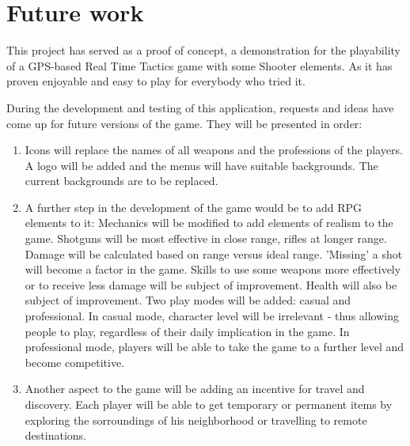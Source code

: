 
\section{Future work}


This project has served as a proof of concept, a demonstration for the
playability of a GPS-based Real Time Tactics game with some Shooter elements. As
it has proven enjoyable and easy to play for everybody who tried it.\newline

During the development and testing of this application, requests and ideas have
come up for future versions of the game. They will be presented in
order:\newline
\begin{enumerate}
  \item Icons will replace the names of all weapons and the professions of the
  players. A logo will be added and the menus will have suitable backgrounds.
  The current backgrounds are to be replaced.
  
  \item A further step in the development of the game would be to add RPG
  elements to it: Mechanics will be modified to add elements of realism to the
  game. Shotguns will be most effective in close range, rifles at longer range.
  Damage will be calculated based on range versus ideal range. 'Missing' a shot
  will become a factor in the game. Skills to use some weapons more effectively
  or to receive less damage will be subject of improvement. Health will also be
  subject of improvement. Two play modes will be added: casual and professional.
  In casual mode, character level will be irrelevant - thus allowing people to
  play, regardless of their daily implication in the game. In professional mode,
  players will be able to take the game to a further level and become
  competitive.
  
  \item Another aspect to the game will be adding an incentive for travel and
  discovery. Each player will be able to get temporary or permanent items by
  exploring the sorroundings of his neighborhood or travelling to remote
  destinations.   
  

\end{enumerate}
